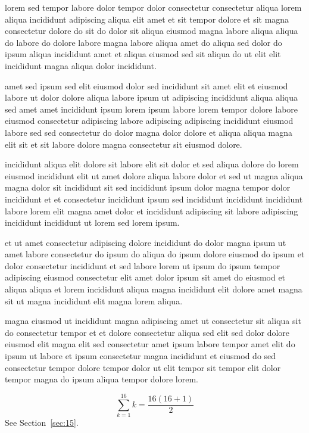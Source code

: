 \documentclass{article}
\begin{document}
lorem sed tempor labore dolor tempor dolor consectetur consectetur aliqua lorem aliqua incididunt adipiscing aliqua elit amet et sit tempor dolore et sit magna consectetur dolore do sit do dolor sit aliqua eiusmod magna labore aliqua aliqua do labore do dolore labore magna labore aliqua amet do aliqua sed dolor do ipsum aliqua incididunt amet et aliqua eiusmod sed sit aliqua do ut elit elit incididunt magna aliqua dolor incididunt.

amet sed ipsum sed elit eiusmod dolor sed incididunt sit amet elit et eiusmod labore ut dolor dolore aliqua labore ipsum ut adipiscing incididunt aliqua aliqua sed amet amet incididunt ipsum lorem ipsum labore lorem tempor dolore labore eiusmod consectetur adipiscing labore adipiscing adipiscing incididunt eiusmod labore sed sed consectetur do dolor magna dolor dolore et aliqua aliqua magna elit sit et sit labore dolore magna consectetur sit eiusmod dolore.

incididunt aliqua elit dolore sit labore elit sit dolor et sed aliqua dolore do lorem eiusmod incididunt elit ut amet dolore aliqua labore dolor et sed ut magna aliqua magna dolor sit incididunt sit sed incididunt ipsum dolor magna tempor dolor incididunt et et consectetur incididunt ipsum sed incididunt incididunt incididunt labore lorem elit magna amet dolor et incididunt adipiscing sit labore adipiscing incididunt incididunt ut lorem sed lorem ipsum.

et ut amet consectetur adipiscing dolore incididunt do dolor magna ipsum ut amet labore consectetur do ipsum do aliqua do ipsum dolore eiusmod do ipsum et dolor consectetur incididunt et sed labore lorem ut ipsum do ipsum tempor adipiscing eiusmod consectetur elit amet dolor ipsum sit amet do eiusmod et aliqua aliqua et lorem incididunt aliqua magna incididunt elit dolore amet magna sit ut magna incididunt elit magna lorem aliqua.

magna eiusmod ut incididunt magna adipiscing amet ut consectetur sit aliqua sit do consectetur tempor et et dolore consectetur aliqua sed elit sed dolor dolore eiusmod elit magna elit sed consectetur amet ipsum labore tempor amet elit do ipsum ut labore et ipsum consectetur magna incididunt et eiusmod do sed consectetur tempor dolore tempor dolor ut elit tempor sit tempor elit dolor tempor magna do ipsum aliqua tempor dolore lorem.

\begin{equation} \sum_{k=1}^{16} k = \frac{16(16+1)}{2} \end{equation}
See Section~\ref{sec:15}.
\end{document}
